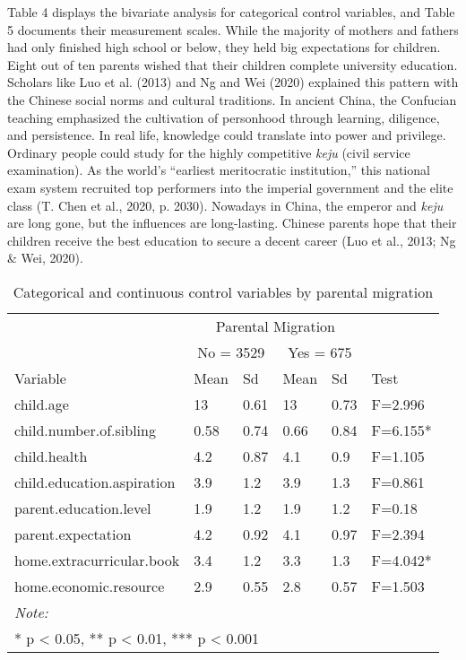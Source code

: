 \documentclass[
  man]{apa7}
\begin{document}
Table 4 displays the bivariate analysis for categorical control variables, and Table 5 documents their measurement scales. While the majority of mothers and fathers had only finished high school or below, they held big expectations for children. Eight out of ten parents wished that their children complete university education. Scholars like Luo et al. (2013) and Ng and Wei (2020) explained this pattern with the Chinese social norms and cultural traditions. In ancient China, the Confucian teaching emphasized the cultivation of personhood through learning, diligence, and persistence. In real life, knowledge could translate into power and privilege. Ordinary people could study for the highly competitive \emph{keju} (civil service examination). As the world's ``earliest meritocratic institution,'' this national exam system recruited top performers into the imperial government and the elite class (T. Chen et al., 2020, p. 2030). Nowadays in China, the emperor and \emph{keju} are long gone, but the influences are long-lasting. Chinese parents hope that their children receive the best education to secure a decent career (Luo et al., 2013; Ng \& Wei, 2020).

\begin{table}

\caption{\label{tab:tab-ctvar-cnt}Categorical and continuous control variables by parental migration}
\centering
\begin{tabular}[t]{llllll}
\toprule
\multicolumn{1}{c}{ } & \multicolumn{4}{c}{Parental Migration} \\
\cmidrule(l{3pt}r{3pt}){2-5}
\multicolumn{1}{c}{ } & \multicolumn{2}{c}{No = 3529} & \multicolumn{2}{c}{Yes = 675} \\
\cmidrule(l{3pt}r{3pt}){2-3} \cmidrule(l{3pt}r{3pt}){4-5}
Variable & Mean & Sd & Mean & Sd & Test\\
\midrule
child.age & 13 & 0.61 & 13 & 0.73 & F=2.996\\
child.number.of.sibling & 0.58 & 0.74 & 0.66 & 0.84 & F=6.155*\\
child.health & 4.2 & 0.87 & 4.1 & 0.9 & F=1.105\\
child.education.aspiration & 3.9 & 1.2 & 3.9 & 1.3 & F=0.861\\
parent.education.level & 1.9 & 1.2 & 1.9 & 1.2 & F=0.18\\
\addlinespace
parent.expectation & 4.2 & 0.92 & 4.1 & 0.97 & F=2.394\\
home.extracurricular.book & 3.4 & 1.2 & 3.3 & 1.3 & F=4.042*\\
home.economic.resource & 2.9 & 0.55 & 2.8 & 0.57 & F=1.503\\
\bottomrule
\multicolumn{6}{l}{\rule{0pt}{1em}\textit{Note: }}\\
\multicolumn{6}{l}{\rule{0pt}{1em}* p < 0.05, ** p < 0.01, *** p < 0.001}\\
\end{tabular}
\end{table}
\end{document}
